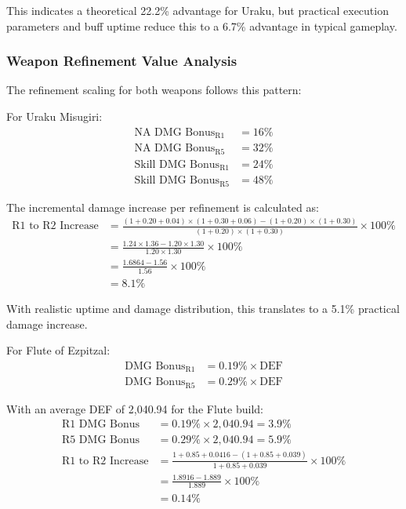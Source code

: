 \documentclass[12pt,a4paper]{article}
\begin{document}
This indicates a theoretical 22.2\% advantage for Uraku, but practical execution parameters and buff uptime reduce this to a 6.7\% advantage in typical gameplay.

\subsubsection{Weapon Refinement Value Analysis}

The refinement scaling for both weapons follows this pattern:

For Uraku Misugiri:
\begin{align}
\text{NA DMG Bonus}_{\text{R1}} &= 16\% \\
\text{NA DMG Bonus}_{\text{R5}} &= 32\% \\
\text{Skill DMG Bonus}_{\text{R1}} &= 24\% \\
\text{Skill DMG Bonus}_{\text{R5}} &= 48\%
\end{align}

The incremental damage increase per refinement is calculated as:
\begin{align}
\text{R1 to R2 Increase} &= \frac{(1 + 0.20 + 0.04) \times (1 + 0.30 + 0.06) - (1 + 0.20) \times (1 + 0.30)}{(1 + 0.20) \times (1 + 0.30)} \times 100\% \\
&= \frac{1.24 \times 1.36 - 1.20 \times 1.30}{1.20 \times 1.30} \times 100\% \\
&= \frac{1.6864 - 1.56}{1.56} \times 100\% \\
&= 8.1\%
\end{align}

With realistic uptime and damage distribution, this translates to a 5.1\% practical damage increase.

For Flute of Ezpitzal:
\begin{align}
\text{DMG Bonus}_{\text{R1}} &= 0.19\% \times \text{DEF} \\
\text{DMG Bonus}_{\text{R5}} &= 0.29\% \times \text{DEF}
\end{align}

With an average DEF of 2,040.94 for the Flute build:
\begin{align}
\text{R1 DMG Bonus} &= 0.19\% \times 2,040.94 = 3.9\% \\
\text{R5 DMG Bonus} &= 0.29\% \times 2,040.94 = 5.9\% \\
\text{R1 to R2 Increase} &= \frac{1 + 0.85 + 0.0416 - (1 + 0.85 + 0.039)}{1 + 0.85 + 0.039} \times 100\% \\
&= \frac{1.8916 - 1.889}{1.889} \times 100\% \\
&= 0.14\%
\end{align}
\end{document}
